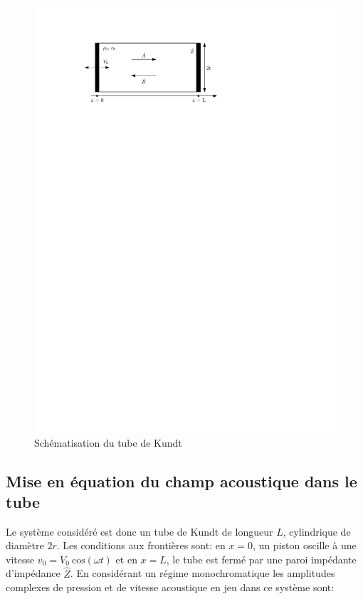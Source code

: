 \documentclass[a4paper,11pt]{article}
\begin{document}
\begin{figure}[H]
	\centering 
	\includegraphics[scale=1]{Figures/tubeKundt_schema.pdf}
	\caption{Schématisation du tube de Kundt}
	\label{fig:schematK} 
\end{figure}

\subsection{Mise en équation du champ acoustique dans le tube}

Le système considéré est donc un tube de Kundt de longueur $L$, cylindrique de diamètre $2r$. Les conditions aux frontières sont: en $x = 0$, un piston oscille à une vitesse $v_0 = V_0 \:  \text{cos}(\omega t)$ et en $x = L$, le tube est fermé par une paroi impédante d'impédance $\hat{Z}$. En considérant un régime monochromatique les amplitudes complexes de pression et de vitesse acoustique en jeu dans ce système sont:
\end{document}
